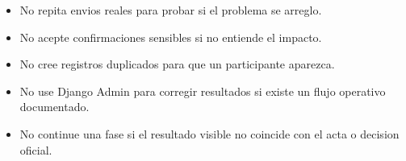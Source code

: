 \begin{itemize}
    \item No repita envios reales para probar si el problema se arreglo.
    \item No acepte confirmaciones sensibles si no entiende el impacto.
    \item No cree registros duplicados para que un participante aparezca.
    \item No use Django Admin para corregir resultados si existe un flujo operativo documentado.
    \item No continue una fase si el resultado visible no coincide con el acta o decision oficial.
\end{itemize}
